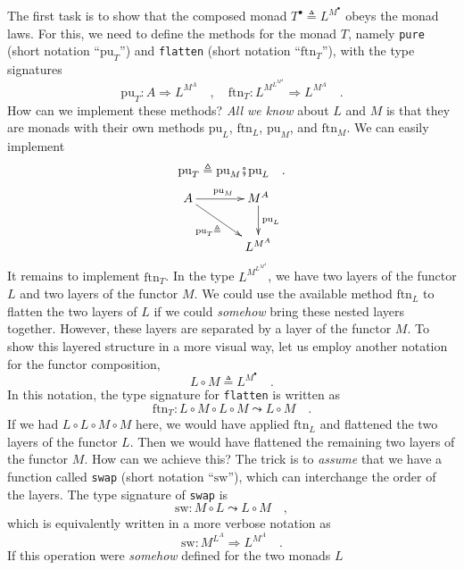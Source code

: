 The first task is to show that the composed monad $T^{\bullet}\triangleq L^{M^{\bullet}}$
obeys the monad laws. For this, we need to define the methods for
the monad $T$, namely \lstinline!pure!
(short notation ``$\text{pu}_{T}$'') and \texttt{}\lstinline!flatten!
(short notation ``$\text{ftn}_{T}$''), with the type signatures
\[
\text{pu}_{T}:A\Rightarrow L^{M^{A}}\quad,\quad\text{ftn}_{T}:L^{M^{L^{M^{A}}}}\Rightarrow L^{M^{A}}\quad.
\]
How can we implement these methods? \emph{All we know} about $L$
and $M$ is that they are monads with their own methods $\text{pu}_{L}$,
$\text{ftn}_{L}$, $\text{pu}_{M}$, and $\text{ftn}_{M}$. We can
easily implement 
\begin{equation}
\text{pu}_{T}\triangleq\text{pu}_{M}\bef\text{pu}_{L}\quad.\label{eq:def-of-pure-T}
\end{equation}
\[
\xymatrix{\xyScaleY{2pc}\xyScaleX{3pc}A\ar[r]\sp(0.5){\text{pu}_{M}}\ar[rd]\sb(0.45){\text{pu}_{T}\triangleq} & M^{A}\ar[d]\sp(0.45){\text{pu}_{L}}\\
 & L^{M^{A}}
}
\]
It remains to implement $\text{ftn}_{T}$. In the type $L^{M^{L^{M^{A}}}}$,
we have two layers of the functor $L$ and two layers of the functor
$M$. We could use the available method $\text{ftn}_{L}$ to flatten
the two layers of $L$ if we could \emph{somehow} bring these nested
layers together. However, these layers are separated by a layer of
the functor $M$. To show this layered structure in a more visual
way, let us employ another notation for the functor composition, 
\[
L\circ M\triangleq L^{M^{\bullet}}\quad.
\]
In this notation, the type signature for \texttt{}\lstinline!flatten!
is written as
\[
\text{ftn}_{T}:L\circ M\circ L\circ M\leadsto L\circ M\quad.
\]
If we had $L\circ L\circ M\circ M$ here, we would have applied $\text{ftn}_{L}$
and flattened the two layers of the functor $L$. Then we would have
flattened the remaining two layers of the functor $M$. How can we
achieve this? The trick is to \emph{assume} that we have a function
called \lstinline!swap!
(short notation ``$\text{sw}$''), which can interchange the order
of the layers. The type signature of \lstinline!swap!
is
\[
\text{sw}:M\circ L\leadsto L\circ M\quad,
\]
which is equivalently written in a more verbose notation as
\[
\text{sw}:M^{L^{A}}\Rightarrow L^{M^{A}}\quad.
\]
If this operation were \emph{somehow} defined for the two monads $L$
